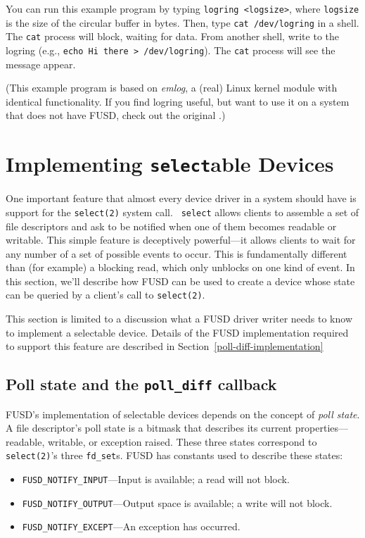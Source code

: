 \documentclass{article}
\begin{document}
You can run this example program by typing {\tt logring <logsize>},
where {\tt logsize} is the size of the circular buffer in bytes.
Then, type {\tt cat /dev/logring} in a shell.  The {\tt cat} process
will block, waiting for data.  From another shell, write to the
logring (e.g., {\tt echo Hi there > /dev/logring}).  The {\tt cat}
process will see the message appear.

(This example program is based on {\em emlog}, a (real) Linux kernel
module with identical functionality.  If you find logring useful, but
want to use it on a system that does not have FUSD, check out the
original
.)





\section{Implementing {\tt select}able Devices}
\label{selectable}

One important feature that almost every device driver in a system
should have is support for the {\tt select(2)} system call.  {\tt
select} allows clients to assemble a set of file descriptors and ask
to be notified when one of them becomes readable or writable.  This
simple feature is deceptively powerful---it allows clients to wait for
any number of a set of possible events to occur.  This is
fundamentally different than (for example) a blocking read, which only
unblocks on one kind of event.  In this section, we'll describe how
FUSD can be used to create a device whose state can be queried by a
client's call to {\tt select(2)}.

This section is limited to a discussion what a FUSD driver writer
needs to know to implement a selectable device.  Details of the FUSD
implementation required to support this feature are described in
Section~\ref{poll-diff-implementation}


\subsection{Poll state and the {\tt poll\_diff} callback}

FUSD's implementation of selectable devices depends on the concept of
{\em poll state}.  A file descriptor's poll state is a bitmask that
describes its current properties---readable, writable, or exception
raised.  These three states correspond to {\tt select(2)}'s three
{\tt fd\_set}s.  FUSD has constants used to describe these states:
\begin{itemize}
\item {\tt FUSD\_NOTIFY\_INPUT}---Input is available; a read will not
block.
\item {\tt FUSD\_NOTIFY\_OUTPUT}---Output space is available; a write
will not block.
\item {\tt FUSD\_NOTIFY\_EXCEPT}---An exception has occurred.
\end{itemize}
\end{document}
